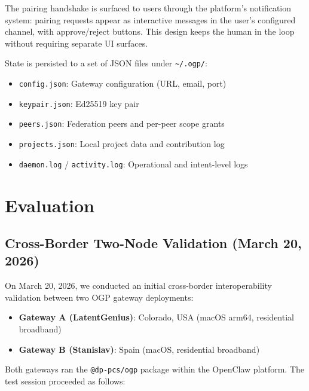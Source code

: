 \documentclass[conference]{IEEEtran}
\begin{document}
The pairing handshake is surfaced to users through the platform's notification system: pairing requests appear as interactive messages in the user's configured channel, with approve/reject buttons. This design keeps the human in the loop without requiring separate UI surfaces.

State is persisted to a set of JSON files under \texttt{\textasciitilde/.ogp/}:

\begin{itemize}
  \item \texttt{config.json}: Gateway configuration (URL, email, port)
  \item \texttt{keypair.json}: Ed25519 key pair
  \item \texttt{peers.json}: Federation peers and per-peer scope grants
  \item \texttt{projects.json}: Local project data and contribution log
  \item \texttt{daemon.log} / \texttt{activity.log}: Operational and intent-level logs
\end{itemize}

\section{Evaluation}
\label{sec:evaluation}

\subsection{Cross-Border Two-Node Validation (March 20, 2026)}

On March 20, 2026, we conducted an initial cross-border interoperability validation between two OGP gateway deployments:

\begin{itemize}
  \item \textbf{Gateway A (LatentGenius)}: Colorado, USA (macOS arm64, residential broadband)
  \item \textbf{Gateway B (Stanislav)}: Spain (macOS, residential broadband)
\end{itemize}

Both gateways ran the \texttt{@dp-pcs/ogp} package within the OpenClaw platform. The test session proceeded as follows:
\end{document}
